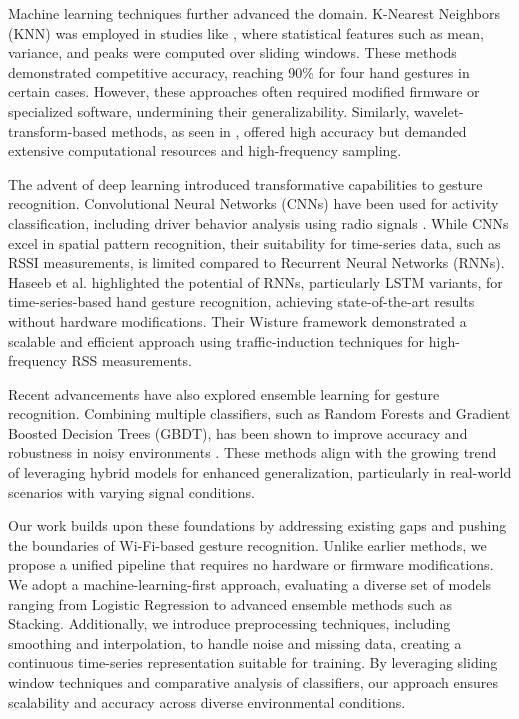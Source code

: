 \documentclass[10pt,twocolumn,letterpaper]{article}
\begin{document}
Machine learning techniques further advanced the domain. K-Nearest Neighbors (KNN) was employed in studies like \cite{knn1, knn2}, where statistical features such as mean, variance, and peaks were computed over sliding windows. These methods demonstrated competitive accuracy, reaching 90\% for four hand gestures in certain cases. However, these approaches often required modified firmware or specialized software, undermining their generalizability. Similarly, wavelet-transform-based methods, as seen in \cite{dwt_method}, offered high accuracy but demanded extensive computational resources and high-frequency sampling.

The advent of deep learning introduced transformative capabilities to gesture recognition. Convolutional Neural Networks (CNNs) have been used for activity classification, including driver behavior analysis using radio signals \cite{wang2017wifi}. While CNNs excel in spatial pattern recognition, their suitability for time-series data, such as RSSI measurements, is limited compared to Recurrent Neural Networks (RNNs). Haseeb et al. \cite{haseeb2020wisture} highlighted the potential of RNNs, particularly LSTM variants, for time-series-based hand gesture recognition, achieving state-of-the-art results without hardware modifications. Their Wisture framework demonstrated a scalable and efficient approach using traffic-induction techniques for high-frequency RSS measurements.

Recent advancements have also explored ensemble learning for gesture recognition. Combining multiple classifiers, such as Random Forests and Gradient Boosted Decision Trees (GBDT), has been shown to improve accuracy and robustness in noisy environments \cite{ensemble_learning}. These methods align with the growing trend of leveraging hybrid models for enhanced generalization, particularly in real-world scenarios with varying signal conditions.

Our work builds upon these foundations by addressing existing gaps and pushing the boundaries of Wi-Fi-based gesture recognition. Unlike earlier methods, we propose a unified pipeline that requires no hardware or firmware modifications. We adopt a machine-learning-first approach, evaluating a diverse set of models ranging from Logistic Regression to advanced ensemble methods such as Stacking. Additionally, we introduce preprocessing techniques, including smoothing and interpolation, to handle noise and missing data, creating a continuous time-series representation suitable for training. By leveraging sliding window techniques and comparative analysis of classifiers, our approach ensures scalability and accuracy across diverse environmental conditions.
\end{document}
